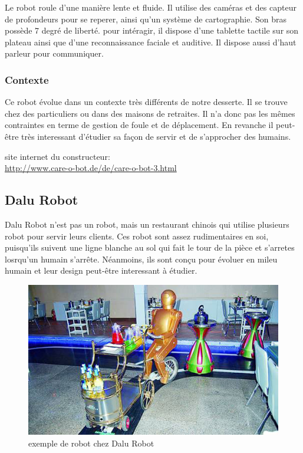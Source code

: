 Le robot roule d'une manière lente et fluide. Il utilise des caméras et des capteur de profondeurs pour se reperer, ainsi qu'un système de cartographie. Son bras possède 7 degré de liberté. pour intéragir, il dispose d'une tablette tactile sur son plateau ainsi que d'une reconnaissance faciale et auditive. Il dispose aussi d'haut parleur pour communiquer.

\subsubsection*{Contexte}

Ce robot évolue dans un contexte très différents de notre desserte. Il se trouve chez des particuliers ou dans des maisons de retraites. Il n'a donc pas les mêmes contraintes en terme de gestion de foule et de déplacement. En revanche il peut-être très interessant d'étudier sa façon de servir et de s'approcher des humains.

site internet du constructeur:\\
\url{http://www.care-o-bot.de/de/care-o-bot-3.html}

\newpage

\subsection*{Dalu Robot}

Dalu Robot n'est pas un robot, mais un restaurant chinois qui utilise plusieurs robot pour servir leurs clients. Ces robot sont assez rudimentaires en soi, puisqu'ils suivent une ligne blanche au sol qui fait le tour de la pièce et s'arretes losrqu'un humain s'arrête. Néanmoins, ils sont conçu pour évoluer en mileu humain et leur design peut-être interessant à étudier.

\begin{figure}[h]
\begin{center}
\includegraphics[scale=0.55]{Images/dalu-robot-1.jpg}
\caption{exemple de robot chez Dalu Robot}
\label{exemple de robot chez Dalu Robot}
\end{center}
\end{figure}

